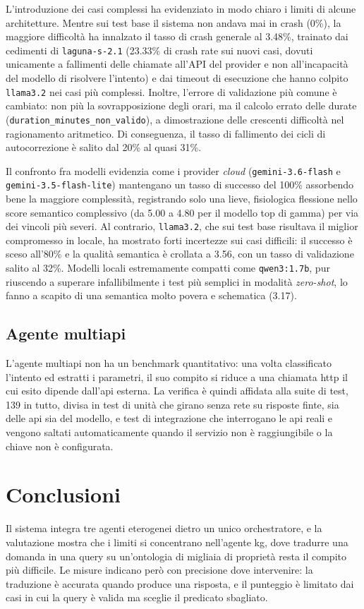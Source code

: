 \documentclass[11pt]{article}
\begin{document}
L'introduzione dei casi complessi ha evidenziato in modo chiaro i limiti di alcune architetture. Mentre sui test base il sistema non andava mai in crash (0\%), la maggiore difficoltà ha innalzato il tasso di crash generale al 3.48\%, trainato dai cedimenti di \texttt{laguna-s-2.1} (23.33\% di crash rate sui nuovi casi, dovuti unicamente a fallimenti delle chiamate all'API del provider e non all'incapacità del modello di risolvere l'intento) e dai timeout di esecuzione che hanno colpito \texttt{llama3.2} nei casi più complessi. Inoltre, l'errore di validazione più comune è cambiato: non più la sovrapposizione degli orari, ma il calcolo errato delle durate (\texttt{duration\_minutes\_non\_valido}), a dimostrazione delle crescenti difficoltà nel ragionamento aritmetico. Di conseguenza, il tasso di fallimento dei cicli di autocorrezione è salito dal 20\% al quasi 31\%.

Il confronto fra modelli evidenzia come i provider \textit{cloud} (\texttt{gemini-3.6-flash} e \texttt{gemini-3.5-flash-lite}) mantengano un tasso di successo del 100\% assorbendo bene la maggiore complessità, registrando solo una lieve, fisiologica flessione nello score semantico complessivo (da 5.00 a 4.80 per il modello top di gamma) per via dei vincoli più severi.
Al contrario, \texttt{llama3.2}, che sui test base risultava il miglior compromesso in locale, ha mostrato forti incertezze sui casi difficili: il successo è sceso all'80\% e la qualità semantica è crollata a 3.56, con un tasso di validazione salito al 32\%. Modelli locali estremamente compatti come \texttt{qwen3:1.7b}, pur riuscendo a superare infallibilmente i test più semplici in modalità \textit{zero-shot}, lo fanno a scapito di una semantica molto povera e schematica (3.17).

\subsection{Agente multiapi}

L'agente multiapi non ha un benchmark quantitativo: una volta classificato l'intento ed estratti i parametri, il suo compito si riduce a una chiamata http il cui esito dipende dall'api esterna. La verifica è quindi affidata alla suite di test, 139 in tutto, divisa in test di unità che girano senza rete su risposte finte, sia delle api sia del modello, e test di integrazione che interrogano le api reali e vengono saltati automaticamente quando il servizio non è raggiungibile o la chiave non è configurata.

\section{Conclusioni}

Il sistema integra tre agenti eterogenei dietro un unico orchestratore, e la valutazione mostra che i limiti si concentrano nell'agente kg, dove tradurre una domanda in una query su un'ontologia di migliaia di proprietà resta il compito più difficile. Le misure indicano però con precisione dove intervenire: la traduzione è accurata quando produce una risposta, e il punteggio è limitato dai casi in cui la query è valida ma sceglie il predicato sbagliato.
\end{document}
